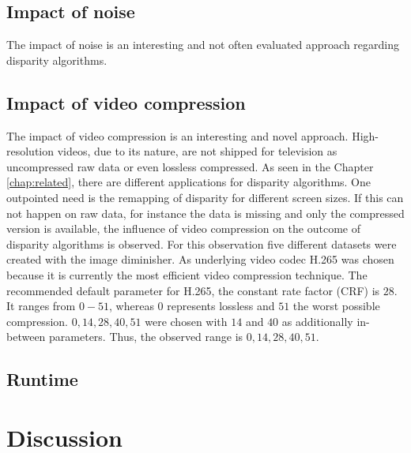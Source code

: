 \subsection{Impact of noise}

The impact of noise is an interesting and not often evaluated approach regarding disparity algorithms.

\subsection{Impact of video compression}

The impact of video compression is an interesting and novel approach.
High-resolution videos, due to its nature, are not shipped for television as uncompressed raw data or even lossless compressed.
As seen in the Chapter \ref{chap:related}, there are different applications for disparity algorithms.
One outpointed need is the remapping of disparity for different screen sizes.
If this can not happen on raw data, for instance the data is missing and only the compressed version is available, the influence of video compression on the outcome of disparity algorithms is observed.
\newline\newline\noindent For this observation five different datasets were created with the image diminisher.
As underlying video codec H.265 was chosen because it is currently the most efficient video compression technique.
The recommended default parameter for H.265, the constant rate factor (CRF) is $28$.
It ranges from $0-51$, whereas $0$ represents lossless and $51$ the worst possible compression.
$0, 14, 28, 40, 51$ were chosen with $14$ and $40$ as additionally in-between parameters.
Thus, the observed range is $0, 14, 28, 40, 51$.

\subsection{Runtime}


\newpage
\section{Discussion}




